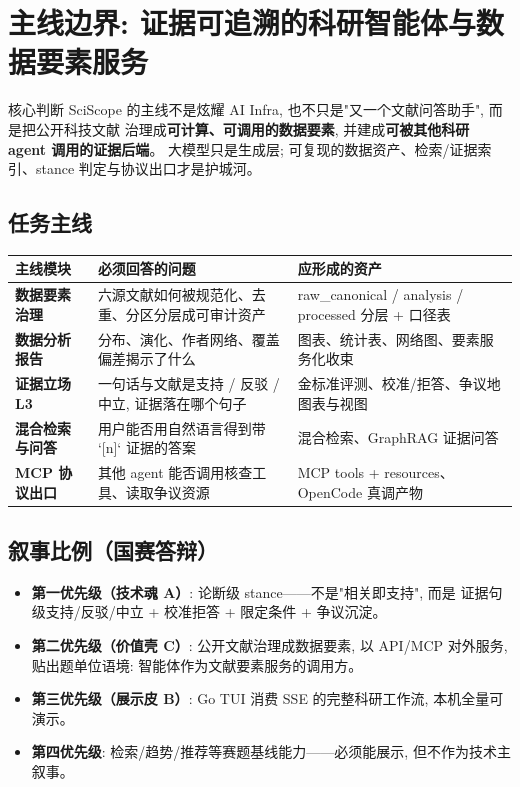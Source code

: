 \section{主线边界: 证据可追溯的科研智能体与数据要素服务}

\begin{designbox}{核心判断}
SciScope 的主线不是炫耀 AI Infra, 也不只是"又一个文献问答助手", 而是把公开科技文献
治理成\textbf{可计算、可调用的数据要素}, 并建成\textbf{可被其他科研 agent 调用的证据后端}。
大模型只是生成层; 可复现的数据资产、检索/证据索引、stance 判定与协议出口才是护城河。
\end{designbox}

\subsection{任务主线}

\begin{center}
\begin{tabularx}{\textwidth}{>{\bfseries}p{30mm}X X}
\toprule
主线模块 & 必须回答的问题 & 应形成的资产 \\
\midrule
数据要素治理 & 六源文献如何被规范化、去重、分区分层成可审计资产 & raw\_canonical / analysis / processed 分层 + 口径表 \\
数据分析报告 & 分布、演化、作者网络、覆盖偏差揭示了什么 & 图表、统计表、网络图、要素服务化收束 \\
证据立场 L3 & 一句话与文献是支持 / 反驳 / 中立, 证据落在哪个句子 & 金标准评测、校准/拒答、争议地图表与视图 \\
混合检索与问答 & 用户能否用自然语言得到带 `[n]` 证据的答案 & 混合检索、GraphRAG 证据问答 \\
MCP 协议出口 & 其他 agent 能否调用核查工具、读取争议资源 & MCP tools + resources、OpenCode 真调产物 \\
\end{tabularx}
\end{center}

\subsection{叙事比例（国赛答辩）}

\begin{plainbox}
\begin{itemize}
  \item \textbf{第一优先级（技术魂 A）}: 论断级 stance——不是"相关即支持", 而是
    证据句级支持/反驳/中立 + 校准拒答 + 限定条件 + 争议沉淀。
  \item \textbf{第二优先级（价值壳 C）}: 公开文献治理成数据要素, 以 API/MCP 对外服务,
    贴出题单位语境: 智能体作为文献要素服务的调用方。
  \item \textbf{第三优先级（展示皮 B）}: Go TUI 消费 SSE 的完整科研工作流, 本机全量可演示。
  \item \textbf{第四优先级}: 检索/趋势/推荐等赛题基线能力——必须能展示, 但不作为技术主叙事。
\end{itemize}
\end{plainbox}

